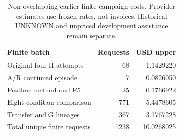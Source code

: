 \begin{table}[htbp]
\centering\small
\begin{tabular}{@{}lrr@{}}
\toprule
Finite batch & Requests & USD upper \\
\midrule
Original four H attempts & 68 & 1.1429220 \\
A/R continued episode & 7 & 0.0826050 \\
Posthoc method and E5 & 25 & 0.1766922 \\
Eight-condition comparison & 771 & 5.4478605 \\
Transfer and G lineages & 367 & 3.1767228 \\
Total unique finite requests & 1238 & 10.0268025 \\
\bottomrule
\end{tabular}
\caption{Non-overlapping earlier finite campaign costs. Provider estimates use frozen rates, not invoices. Historical UNKNOWN and unpriced development assistance remain separate.}\label{tab:costs}
\end{table}
